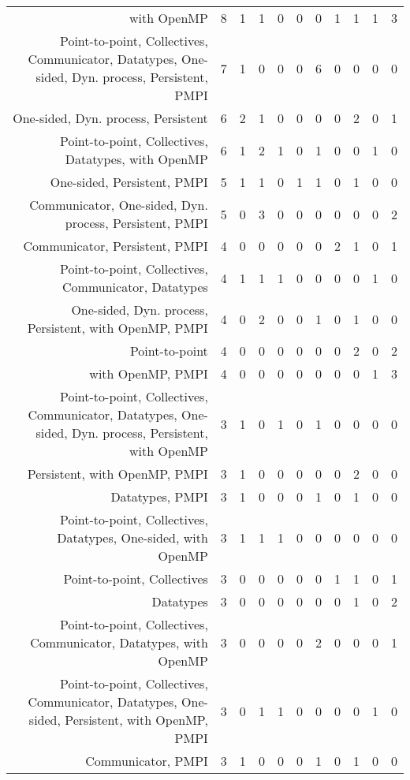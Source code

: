 {\begin{landscape}
\begin{longtable}[htb]{r|c|c|c|c|c|c|c|c|c|c}
{with OpenMP} & 8 & 1 & 1 & 0 & 0 & 0 & 1 & 1 & 1 & 3 \\%
{Point-to-point, Collectives, Communicator, Datatypes, One-sided, Dyn. process, Persistent, PMPI} & 7 & 1 & 0 & 0 & 0 & 6 & 0 & 0 & 0 & 0 \\%
{One-sided, Dyn. process, Persistent} & 6 & 2 & 1 & 0 & 0 & 0 & 0 & 2 & 0 & 1 \\%
{Point-to-point, Collectives, Datatypes, with OpenMP} & 6 & 1 & 2 & 1 & 0 & 1 & 0 & 0 & 1 & 0 \\%
{One-sided, Persistent, PMPI} & 5 & 1 & 1 & 0 & 1 & 1 & 0 & 1 & 0 & 0 \\%
{Communicator, One-sided, Dyn. process, Persistent, PMPI} & 5 & 0 & 3 & 0 & 0 & 0 & 0 & 0 & 0 & 2 \\%
{Communicator, Persistent, PMPI} & 4 & 0 & 0 & 0 & 0 & 0 & 2 & 1 & 0 & 1 \\%
{Point-to-point, Collectives, Communicator, Datatypes} & 4 & 1 & 1 & 1 & 0 & 0 & 0 & 0 & 1 & 0 \\%
{One-sided, Dyn. process, Persistent, with OpenMP, PMPI} & 4 & 0 & 2 & 0 & 0 & 1 & 0 & 1 & 0 & 0 \\%
{Point-to-point} & 4 & 0 & 0 & 0 & 0 & 0 & 0 & 2 & 0 & 2 \\%
{with OpenMP, PMPI} & 4 & 0 & 0 & 0 & 0 & 0 & 0 & 0 & 1 & 3 \\%
{Point-to-point, Collectives, Communicator, Datatypes, One-sided, Dyn. process, Persistent, with OpenMP} & 3 & 1 & 0 & 1 & 0 & 1 & 0 & 0 & 0 & 0 \\%
{Persistent, with OpenMP, PMPI} & 3 & 1 & 0 & 0 & 0 & 0 & 0 & 2 & 0 & 0 \\%
{Datatypes, PMPI} & 3 & 1 & 0 & 0 & 0 & 1 & 0 & 1 & 0 & 0 \\%
{Point-to-point, Collectives, Datatypes, One-sided, with OpenMP} & 3 & 1 & 1 & 1 & 0 & 0 & 0 & 0 & 0 & 0 \\%
{Point-to-point, Collectives} & 3 & 0 & 0 & 0 & 0 & 0 & 1 & 1 & 0 & 1 \\%
{Datatypes} & 3 & 0 & 0 & 0 & 0 & 0 & 0 & 1 & 0 & 2 \\%
{Point-to-point, Collectives, Communicator, Datatypes, with OpenMP} & 3 & 0 & 0 & 0 & 0 & 2 & 0 & 0 & 0 & 1 \\%
{Point-to-point, Collectives, Communicator, Datatypes, One-sided, Persistent, with OpenMP, PMPI} & 3 & 0 & 1 & 1 & 0 & 0 & 0 & 0 & 1 & 0 \\%
{Communicator, PMPI} & 3 & 1 & 0 & 0 & 0 & 1 & 0 & 1 & 0 & 0 \\%

\end{longtable}
\end{landscape}}
